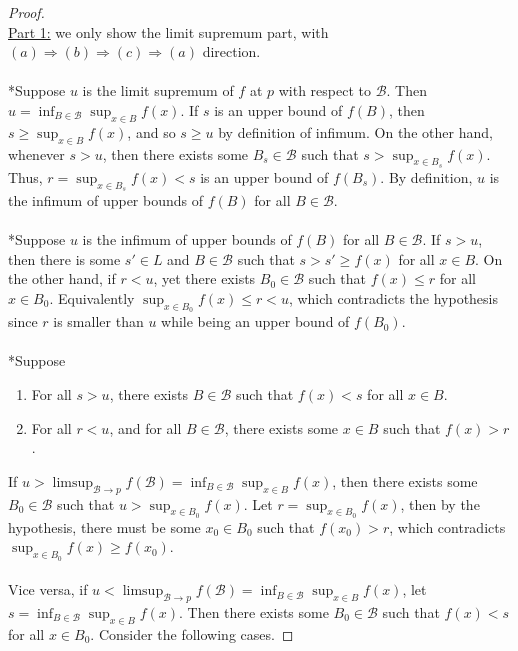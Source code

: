 \documentclass{treatise}
\begin{document}
\begin{proof} \ \\
\underline{Part 1:} we only show the limit supremum part, with $(a) \Rightarrow (b) \Rightarrow (c) \Rightarrow (a)$ direction.
\\
\\
*Suppose $u$ is the limit supremum of $f$ at $p$ with respect to $\mathcal{B}$. Then $u = \inf_{B \in \mathcal{B}} \sup_{x \in B} f(x)$. If $s$ is an upper bound of $f(B)$, then $s \geq \sup_{x \in B} f(x)$, and so $s \geq u$ by definition of infimum. On the other hand, whenever $s > u$, then there exists some $B_s \in \mathcal{B}$ such that $s > \sup_{x \in B_s} f(x)$. Thus, $r = \sup_{x \in B_s} f(x) < s$ is an upper bound of $f(B_s)$. By definition, $u$ is the infimum of upper bounds of $f(B)$ for all $B \in \mathcal{B}$.
\\
\\
*Suppose $u$ is the infimum of upper bounds of $f(B)$ for all $B \in \mathcal{B}$. If $s > u$, then there is some $s' \in L$ and $B \in \mathcal{B}$ such that $s > s' \geq f(x)$ for all $x \in B$. On the other hand, if $r < u$, yet there exists $B_0 \in \mathcal{B}$ such that $f(x) \leq r$ for all $x \in B_0$. Equivalently $\sup_{x \in B_0} f(x) \leq r < u$, which contradicts the hypothesis since $r$ is smaller than $u$ while being an upper bound of $f(B_0)$.
\\
\\
*Suppose
\begin{enumerate}
    \item For all $s > u$, there exists $B \in \mathcal{B}$ such that $f(x) < s$ for all $x \in B$.
    \item For all $r < u$, and for all $B \in \mathcal{B}$, there exists some $x \in B$ such that $f(x) > r$.
\end{enumerate}
If $u > \limsup_{\mathcal{B} \to p} f(\mathcal{B}) = \inf_{B \in \mathcal{B}} \sup_{x \in B} f(x)$, then there exists some $B_0 \in \mathcal{B}$ such that $u > \sup_{x \in B_0} f(x)$. Let $r = \sup_{x \in B_0} f(x)$, then by the hypothesis, there must be some $x_0 \in B_0$ such that $f(x_0) > r$, which contradicts $\sup_{x \in B_0} f(x) \geq f(x_0)$.
\\
\\
Vice versa, if $u < \limsup_{\mathcal{B} \to p} f(\mathcal{B}) = \inf_{B \in \mathcal{B}} \sup_{x \in B} f(x)$, let $s = \inf_{B \in \mathcal{B}} \sup_{x \in B} f(x)$. Then there exists some $B_0 \in \mathcal{B}$ such that $f(x) < s$ for all $x \in B_0$. Consider the following cases.

\end{proof}
\end{document}
